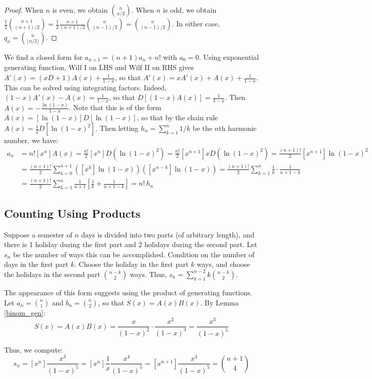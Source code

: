 \documentclass[a4paper]{article}
\begin{document}
\begin{theorem}
\begin{hl}
\begin{proof}
When $n$ is even, we obtain $\binom n{n/2}$. When $n$ is odd, we obtain $\frac12\binom{n+1}{(n+1)/2}=\frac12\frac{n+1}{(n+1)/2}\binom{n}{(n-1)/2}=\binom n{(n-1)/2}$. In either case, $q_n=\binom n{\lfloor n/2\rfloor}$.
\end{proof}
\end{hl}
\end{theorem}

\begin{example}
We find a closed form for $a_{n+1}=(n+1)a_n+n!$ with $a_0=0$. Using exponential generating function, Wilf I on LHS and Wilf II on RHS gives $A'(x)=(xD+1)A(x)+\frac1{1-x}$, so that $A'(x)=xA'(x)+A(x)+\frac1{1-x}$. This can be solved using integrating factors. Indeed, $(1-x)A'(x)-A(x)=\frac1{1-x}$, so that $D[(1-x)A(x)]=\frac1{1-x}$. Then $A(x)=-\frac{\ln(1-x)}{1-x}$. Note that this is of the form $A(x)=[\ln(1-x)]D[\ln(1-x)]$, so that by the chain rule $A(x)=\frac12D[\ln(1-x)^2]$. Then letting $h_n=\sum_{k=1}^n1/k$ be the $n$th harmonic number, we have:
\begin{align*}
a_n
&=n![x^n]A(x)
=\frac{n!}2[x^n]D(\ln(1-x)^2)
=\frac{n!}2[x^{n+1}]xD(\ln(1-x)^2)
=\frac{(n+1)!}2[x^{n+1}]\ln(1-x)^2\\
&=\frac{(n+1)!}2\sum_{k=0}^{n+1}([x^k]\ln(1-x))([x^{n-k}]\ln(1-x))
=\frac{(n+1)!}2\sum_{k=1}^{n}\frac1k\cdot\frac1{n+1-k}\\
&=\frac{(n+1)!}2\sum_{k=1}^n\frac1{n+1}\left[\frac1k+\frac1{n+1-k}\right]
=n!\,h_n
\end{align*}
\end{example}

\subsection{Counting Using Products}


\begin{example}
Suppose a semester of $n$ days is divided into two parts (of arbitrary length), and there is 1 holiday during the first part and 2 holidays during the second part. Let $s_n$ be the number of ways this can be accomplished. Condition on the number of days in the first part $k$. Choose the holiday in the first part $k$ ways, and choose the holidays in the second part $\binom{n-k}2$ ways. Thus, $s_n=\sum_{k=1}^{n-2}k\binom{n-k}2$.

\medskip

The appearance of this form suggests using the product of generating functions. Let $a_n=\binom n1$ and $b_n=\binom n2$, so that $S(x)=A(x)B(x)$. By Lemma \ref{binom_gen}:
\begin{equation*}
S(x)
=A(x)B(x)
=\frac{x}{(1-x)^2}\cdot \frac{x^2}{(1-x)^3}
=\frac{x^3}{(1-x)^5}
\end{equation*}

Thus, we compute:
\begin{equation*}
s_n
=[x^n]\frac{x^3}{(1-x)^5}
=[x^n]\frac1x\frac{x^4}{(1-x)^5}
=[x^{n+1}]\frac{x^4}{(1-x)^5}
=\binom{n+1}4
\end{equation*}
\end{example}
\end{document}
